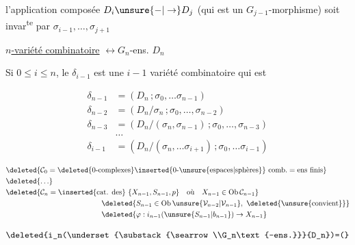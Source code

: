 
l'application composée $D_i\unsure{-|\to}D_j$ (qui est un $G_{j-1}$-morphisme) soit invar\textsuperscript{te} par $\sigma_{i-1},\ldots,\sigma_{j+1}$

\uline{$n$-variété combinatoire} $\leftrightarrow G_n$-ens. $D_n$

Si $0\leq i\leq n$, le   $\delta_{i-1}$  est une $i-1$ variété combinatoire qui est

\[
\begin{aligned}
\delta_{n-1}&=(D_n\,;\sigma_0,\ldots\sigma_{n-1})\\
\delta_{n-2}&=(D_n/\sigma_n\,;\sigma_0,\ldots,\sigma_{n-2})\\
\delta_{n-3}&=(D_n/(\sigma_n,\sigma_{n-1})\,;\sigma_0,\ldots,\sigma_{n-3})\\
&\ldots\\
\delta_{i-1}&=(D_n/(\sigma_n,\ldots\sigma_{i+1})\,;\sigma_0,\ldots\sigma_{i-1})
\end{aligned}
\]



\[
\begin{aligned}
&\deleted{\mathcal C_0=\deleted{0\text{-complexes}}\inserted{0\text{-\unsure{espaces|sphères}}}\ \text{comb.}=\text{ens finis}}\\
&\deleted{\ldots}\\
&\deleted{\mathcal C_n=\inserted{\text{cat. des}}\ \{X_{n-1},S_{n-1},p\}\quad\text{où}\quad X_{n-1}\in\operatorname{Ob}\mathcal C_{n-1}}\\
&\hspace{13em}\deleted{S_{n-1}\in\operatorname{Ob}\unsure{\mathcal V_{n-2}|\mathcal V_{n-1}},\ \deleted{\text{\unsure{convient}}}}\\
&\hspace{13em}\deleted{\varphi:i_{n-1}(\unsure{S_{n-1}|b_{n-1}})\to X_{n-1}}
\end{aligned}
\]

\[
 \deleted{i_n(\underset{\substack{\searrow\\G_n\text{-ens.}}}{D_n})=(}
\]


